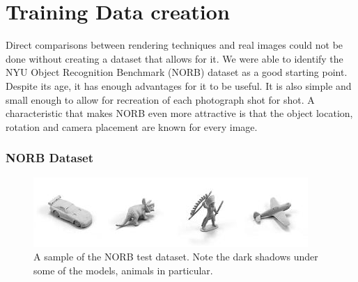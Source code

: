 \documentclass[10pt,twocolumn,letterpaper]{article}
\begin{document}
\section{Training Data creation}
Direct comparisons between rendering techniques and real images could not be done without creating a dataset that allows for it.  We were able to identify the NYU Object Recognition Benchmark (NORB) dataset \cite{LeCun:2004:LMG:1896300.1896315} as a good starting point. Despite its age, it has enough advantages for it to be useful.  It is also simple and small enough to allow for recreation of each photograph shot for shot.  A characteristic that makes NORB even more attractive is that the object location, rotation and camera placement are known for every image.
\subsubsection{NORB Dataset}

\begin{figure}[h!]
\centering
\includegraphics[width=1.0\columnwidth]{./assets/NORBTestSmall.png}
\caption{A sample of the NORB test dataset. Note the dark shadows under some of the models, animals in particular.}
\label{fig:norb-samples}
\end{figure}
\end{document}

